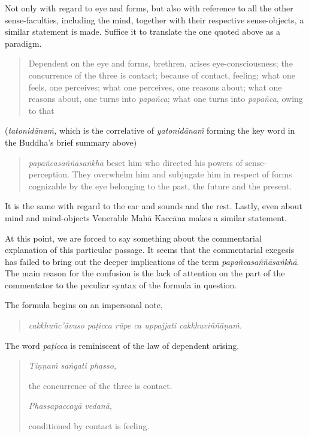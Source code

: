 Not only with regard to eye and forms, but also with reference to all the other sense-faculties, including the mind, together with their respective sense-objects, a similar statement is made. Suffice it to translate the one quoted above as a paradigm.

\begin{quote}
Dependent on the eye and forms, brethren, arises eye-consciousness; the concurrence of the three is contact; because of contact, feeling; what one feels, one perceives; what one perceives, one reasons about; what one reasons about, one turns into \emph{papañca}; what one turns into \emph{papañca}, owing to that
\end{quote}

(\emph{tatonidānaṁ,} which is the correlative of \emph{yatonidānaṁ} forming the key word in the Buddha's brief summary above)

\begin{quote}
\emph{papañcasaññāsaṅkhā} beset him who directed his powers of sense-perception. They overwhelm him and subjugate him in respect of forms cognizable by the eye belonging to the past, the future and the present.
\end{quote}

It is the same with regard to the ear and sounds and the rest. Lastly, even about mind and mind-objects Venerable Mahā Kaccāna makes a similar statement.

At this point, we are forced to say something about the commentarial explanation of this particular passage. It seems that the commentarial exegesis has failed to bring out the deeper implications of the term \emph{papañcasaññāsaṅkhā}. The main reason for the confusion is the lack of attention on the part of the commentator to the peculiar syntax of the formula in question.

The formula begins on an impersonal note,

\begin{quote}
\emph{cakkhuñc'āvuso paṭicca rūpe ca uppajjati cakkhuviññāṇaṁ.}
\end{quote}

The word \emph{paṭicca} is reminiscent of the law of dependent arising.

\begin{quote}
\emph{Tiṇṇaṁ saṅgati phasso,}

the concurrence of the three is contact.

\emph{Phassapaccayā vedanā,}

conditioned by contact is feeling.
\end{quote}

